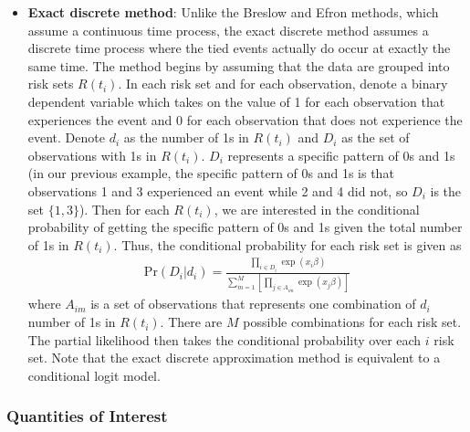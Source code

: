 \begin{itemize}
\begin{itemize}
\item \textbf{Exact discrete method}: Unlike the Breslow and Efron methods, which assume a continuous time process, the exact discrete method assumes a discrete time process where the tied events actually do occur at exactly the same time.  The method begins by assuming that the data are grouped into risk sets $R(t_i)$.  In each risk set and for each observation, denote a binary dependent variable which takes on the value of 1 for each observation that experiences the event and 0 for each observation that does not experience the event.  Denote $d_i$ as the number of 1s in $R(t_i)$ and $D_i$ as the set of observations with 1s in $R(t_i)$.  $D_i$ represents a specific pattern of 0s and 1s (in our previous example, the specific pattern of 0s and 1s is that observations 1 and 3 experienced an event while 2 and 4 did not, so $D_i$ is the set $\{1,3\}$).  Then for each $R(t_i)$, we are interested in the conditional probability of getting the specific pattern of 0s and 1s given the total number of 1s in $R(t_i)$.  Thus, the conditional probability for each risk set is given as
\begin{eqnarray*}
\mathrm{Pr}(D_i | d_i) = \frac{\prod_{i \in D_i} \exp(x_i \beta)}{\sum_{m=1}^M \left[\prod_{j \in A_{im}}\exp(x_j \beta)\right] }
\end{eqnarray*}  
where $A_{im}$ is a set of observations that represents one combination of $d_i$ number of 1s in $R(t_i)$.  There are $M$ possible combinations for each risk set.  The partial likelihood then takes the conditional probability over each $i$ risk set.  Note that the exact discrete approximation method is equivalent to a conditional logit model.
\end{itemize}
\end{itemize}

\subsubsection{Quantities of Interest}

